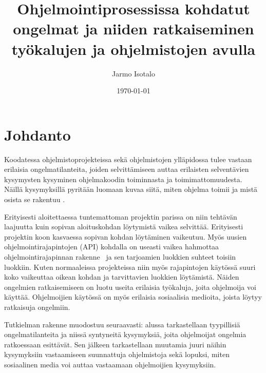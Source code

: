 \documentclass[finnish]{tktltiki2}
\title{Ohjelmointiprosessissa kohdatut ongelmat ja niiden ratkaiseminen työkalujen ja ohjelmistojen avulla}
\author{Jarmo Isotalo}
\date{\today}
\theoremstyle{definition}
\theoremstyle{remark}
\begin{document}

\frontmatter      %

\maketitle        %
\makeabstract     %

\tableofcontents  %


\mainmatter       %

\section{Johdanto}
Koodatessa ohjelmistoprojekteissa sekä ohjelmistojen ylläpidossa tulee vastaan erilaisia ongelmatilanteita, joiden selvittämiseen auttaa erilaisten selventävien kysymysten kysyminen ohjelmakoodin toiminnasta ja toimimattomuudesta. Näillä kysymyksillä pyritään luomaan kuvaa siitä, miten ohjelma toimii ja mistä osista se rakentuu \cite{g_search_code, questions-during-software-evolution-tasks,asking-and-answering-api-questions}.

Erityisesti aloitettaessa tuntemattoman projektin parissa on niin tehtävän laajuutta kuin sopivan aloituskohdan löytymistä vaikea selvittää. Erityisesti projektin koon kasvaessa sopivan kohdan löytäminen vaikeutuu.
Myös uusien ohjelmointirajapintojen (API) kohdalla on useasti vaikea hahmottaa ohjelmointirajapinnan rakenne~\cite{jungloid-mining} ja sen tarjoamien luokkien suhteet toisiin luokkiin. Kuten normaaleissa projekteissa niin myös rajapintojen käytössä suuri koko vaikeuttaa oikean kohdan ja tarvittavien luokkien löytämistä.
Näiden ongelmien ratkaisemiseen on luotu useita erilaisia työkaluja, joita ohjelmoija voi käyttää. Ohjelmoijien käytössä on myös erilaisia sosiaalisia medioita, joista löytyy ratkaisuja ongelmiin.

Tutkielman rakenne muodostuu seuraavasti: alussa tarkastellaan tyypillisiä ongelmatilanteita ja niissä syntyneitä kysymyksiä, joita ohjelmoijat ongelmia ratkoessaan esittävät. Sen jälkeen tarkastellaan muutamia juuri näihin kysymyksiin vastaamiseen suunnattuja ohjelmistoja sekä lopuksi, miten sosiaalinen media voi auttaa vastaamaan ohjelmoijien kysymyksiin.
\end{document}
